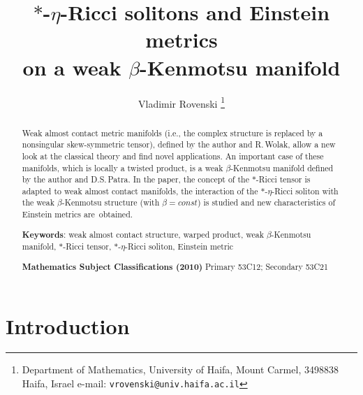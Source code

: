 \documentclass[11pt,a4paper,twoside]{article}
\title{$\ast$-$\eta$-Ricci solitons and Einstein metrics \\ on a weak $\beta$-Kenmotsu manifold}
\author{Vladimir Rovenski
\footnote{Department of Mathematics, University of Haifa, Mount Carmel, 3498838 Haifa, Israel
\newline e-mail: {\tt vrovenski@univ.haifa.ac.il}
}}
\date{}
\begin{document}
\maketitle

\begin{abstract}
Weak almost contact metric manifolds (i.e., the complex structure is replaced by a nonsingular skew-symmetric tensor), defined by the author and R.\,Wolak, allow a new look at the classical theory and find novel applications.
An important case of these manifolds, which is locally a twisted product, is a weak $\beta$-Kenmotsu manifold defined by the author and D.S.\,Patra.
In the paper, the concept of the $\ast$-Ricci tensor is adapted to weak almost contact manifolds,
the interaction of the $\ast$-$\eta$-Ricci soliton with the weak $\beta$-Kenmotsu structure (with $\beta=const$) is studied and new characteristics of Einstein metrics are~obtained.

\vskip1mm\noindent
\textbf{Keywords}:
weak almost contact structure,
warped product,
weak $\beta$-Kenmotsu manifold,
$\ast$-Ricci tensor,
$\ast$-$\eta$-Ricci soliton,
Einstein metric

\vskip1mm\noindent
\textbf{Mathematics Subject Classifications (2010)} Primary 53C12; Secondary 53C21
\end{abstract}


\section{Introduction}
\end{document}
